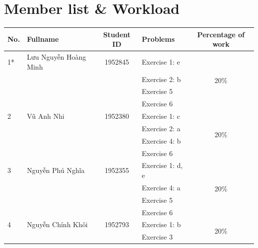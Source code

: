 \documentclass[a4paper]{article}
\numberwithin{equation}{section}
\begin{document}
\section*{Member list \& Workload}
\begin{center}
  \begin{tabular}{llclc}
    \toprule
    \textbf{No.} & \textbf{Fullname}     & \textbf{Student ID} & \textbf{Problems} & \textbf{Percentage of work} \\
    \midrule
    1*           & Lưu Nguyễn Hoàng Minh & 1952845             & Exercise 1: e     & \multirow{4}{*}{20\%}       \\
                 &                       &                     & Exercise 2: b     &                             \\
                 &                       &                     & Exercise 5        &                             \\
                 &                       &                     & Exercise 6        &                             \\
    \midrule
    2            & Vũ Anh Nhi            & 1952380             & Exercise 1: c     & \multirow{4}{*}{20\%}       \\
                 &                       &                     & Exercise 2: a     &                             \\
                 &                       &                     & Exercise 4: b     &                             \\
                 &                       &                     & Exercise 6        &                             \\
    \midrule
    3            & Nguyễn Phú Nghĩa      & 1952355             & Exercise 1: d, e  & \multirow{4}{*}{20\%}       \\
                 &                       &                     & Exercise 4: a     &                             \\
                 &                       &                     & Exercise 5        &                             \\
                 &                       &                     & Exercise 6        &                             \\
    \midrule
    4            & Nguyễn Chính Khôi     & 1952793             & Exercise 1: b     & \multirow{4}{*}{20\%}       \\
                 &                       &                     & Exercise 3        &                             \\

\end{tabular}
\end{center}
\end{document}
